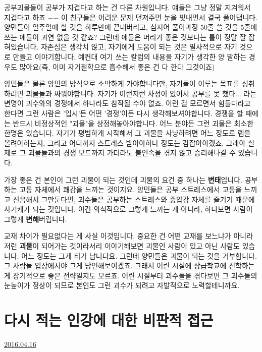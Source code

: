공부괴물들이 공부가 지겹다고 하는 건 다른 차원입니다. 얘들은 그냥 정말 지겨워서 지겹다고 하죠 $-$$-$
이 친구들은 어려운 문제 던져주면 눈을 빛내면서 결국 풀어댑니다.
양민들이 일주일에 할 것을 하루만에 끝내버리고, 심지어 풀이과정 50줄 쓸 것을 5줄에 쓰는 애들이 과연 없을 것 같죠?
그런데 얘들은 머리가 좋은 것보다는 틀이 정말 잘 잡혀있습니다.
자존심은 생각치 않고, 자기에게 도움이 되는 것은 필사적으로 자기 것으로 만들고 이야기합니다.
예컨대 여기 쓰는 칼럼의 내용을 자기가 생각한 양 말하는 경우도 많아요(즉, 이미 자기철학으로 흡수해서 좋은 건 다 한다 그것이죠)
\vspace{5mm}

양민들은 물론 양민의 방식으로 소박하게 가야합니다만, 자기들이 이루는 목표를 성취하려면 괴물들과 싸워야합니다.
자기가 이런저런 사정이 있어서 공부를 못 했다... 라는 변명이 괴수와의 경쟁에서 하나라도 참작될 수야 없죠.
이런 걸 모르면서 힘들다라고 한다면 그런 사람은 '입시'든 어떤 '경쟁'이든 다시 생각해보셔야합니다.
경쟁을 할 때에는 반드시 비정상적인 "괴물"을 상정해놓아야합니다. 어느 분야든 그런 괴물은 최소한 한명은 있습니다.
자기가 평범하게 시작해서 그 괴물을 사냥하려면 어느 정도로 렙을 올려야하는지, 그리고 어디까지 스트레스 받아야하나 정도는 감잡아야겠죠.
그래야 실제로 그 괴물들과의 경쟁 모드까지 가더라도 불연속을 겪지 않고 승리해나갈 수 있습니다.
\vspace{5mm}

가장 좋은 건 본인이 그런 괴물이 되는 것인데
괴물의 요건 중 하나는 \textbf{변태}입니다.
공부하는 고통 자체에서 쾌감을 느끼는 것이지요.
양민들은 공부 스트레스에서 고통을 느끼고 신음해서 그만둔다면,
괴수들은 공부하는 스트레스와 중압감 자체를 즐기기 때문에 사기캐가 되는 것입니다.
이건 의식적으로 그렇게 느끼는 게 아니라, 하다보면 사람이 그렇게 \textbf{변해}버립니다.
\vspace{5mm}

교재 차이가 필요없다는 게 사실 이것입니다. 중요한 건 어떤 교재를 보느냐가 아니라 저런 \textbf{괴물}이 되어가는 것이라서리
이야기해보면 괴물인 사람이 있고 아닌 사람도 있습니다. 어느 정도는 그게 티가 납니다요.
그런데 양민들은 괴물이 되는 것을 거부합니다. 그 사람들 입장에서야 그게 당연해보이겠죠.
그래서 어린 시절에 상급학교에 진학하는 게 장기적으로 좋은 전략일지도 모르죠. 어린 시절부터 괴수들을 겪다보면
그 괴수들의 눈높이가 정상이 되므로 본인도 그런 괴수가 되려고 자발적으로 노력할테니까요.
\vspace{5mm}






\section{다시 적는 인강에 대한 비판적 접근}
\href{https://www.kockoc.com/Apoc/732693}{2016.04.16}

